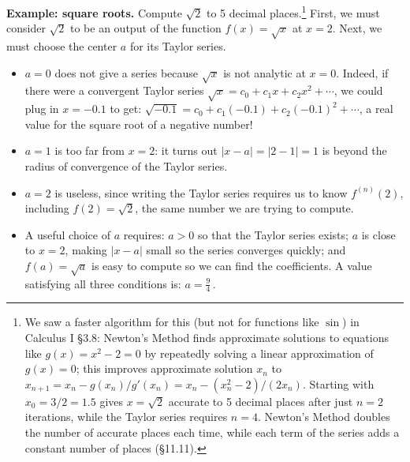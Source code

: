\documentclass[11pt]{article}
\begin{document}
\noindent
{\bf Example: square roots.} Compute $\sqrt{2}$ to 5 decimal places.\footnote{
We saw a faster algorithm for this (but not for functions like $\sin$) in Calculus I \S3.8: 
Newton's Method finds approximate solutions to equations like $g(x)=x^2-2=0$ 
by repeatedly solving a linear approximation of $g(x)=0$;
this improves approximate solution $x_n$ to $x_{n+1}=x_n-g(x_n)/g'(x_n)
=x_n-(x_n^2{-}2)/(2x_n)$.
Starting with $x_0=3/2=1.5$ gives $x=\sqrt 2$ accurate to 5 decimal places
after just $n=2$ iterations, while the Taylor series requires $n=4$.
Newton's Method doubles the number of accurate places each time, 
while each term of the series adds a constant number of places (\S11.11).
} 
First, we must consider $\sqrt 2$ to be an output of the function $f(x)=\sqrt x$ at $x=2$.
Next, we must choose the center $a$ for its Taylor series. 
\begin{itemize}
\item $a=0$ does not give a series because $\sqrt x$ is not analytic at $x=0$.
Indeed, if there were a convergent Taylor series $\sqrt x= c_0 + c_1x+ c_2x^2+\cdots$, 
we could plug in $x=-0.1$ to get:
$\sqrt{-0.1}=c_0 + c_1(-0.1)+ c_2(-0.1)^2+\cdots$, a real value
for the square root of a negative number! 

\item $a=1$ is too far from $x=2$: it turns out $|x{-}a| = |2{-}1|= 1$ is
beyond the radius of convergence of the Taylor series.

\item $a=2$ is useless, since writing the Taylor series requires us to know $f^{(n)}(2)$, including $f(2)=\sqrt 2$, the same number 
we are trying to compute.

\item A useful choice of $a$ requires: $a>0$  so that the Taylor series exists; 
$a$ is close to $x=2$, making $|x{-}a|$ small so the series converges quickly;
and $f(a)=\sqrt a$ is easy to compute  so we can find the coefficients.
A value satisfying all three conditions is:
$a=\tfrac94\,.$

\end{itemize}
\end{document}
